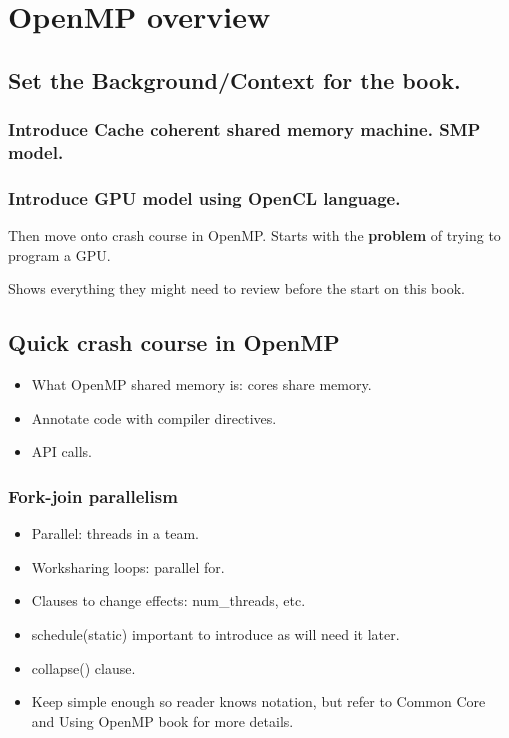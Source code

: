 
\chapter{OpenMP overview}
\label{chapter:overview}

\section{Set the Background/Context for the book.}
\subsection{Introduce Cache coherent shared memory machine. SMP model.}
\subsection{Introduce GPU model using OpenCL language.}
Then move onto crash course in OpenMP.
Starts with the {\bf problem} of trying to program a GPU.

Shows everything they might need to review before the start on this book.

\section{Quick crash course in OpenMP}
\begin{itemize}
  \item What OpenMP shared memory is: cores share memory.
  \item Annotate code with compiler directives.
  \item API calls.
\end{itemize}

\subsection{Fork-join parallelism}
\begin{itemize}
  \item Parallel: threads in a team.
  \item Worksharing loops: parallel for.
  \item Clauses to change effects: num\_threads, etc.
  \item schedule(static) important to introduce as will need it later.
  \item collapse() clause.
  \item Keep simple enough so reader knows notation, but refer to Common Core and Using OpenMP book for more details.
\end{itemize}

